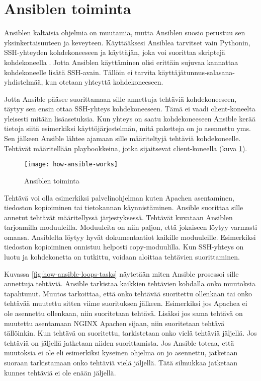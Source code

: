 \section{Ansiblen toiminta}

Ansiblen kaltaisia ohjelmia on muutamia, mutta Ansiblen suosio perustuu sen yksinkertaisuuteen ja keveyteen. Käyttääksesi Ansiblea tarvitset vain Pythonin, SSH-yhteyden kohdekoneeseen ja käyttäjän, joka voi suorittaa skriptejä kohdekoneella \cite{link:what-is-ansible}. Jotta Ansiblen käyttäminen olisi erittäin sujuvaa kannattaa kohdekoneelle lisätä SSH-avain. Tällöin ei tarvita käyttäjätunnus-salasana-yhdistelmää, kun otetaan yhteyttä kohdekoneeseen.

Jotta Ansible pääsee suorittamaan sille annettuja tehtäviä kohdekoneeseen, täytyy sen ensin ottaa SSH-yhteys kohdekoneeseen. Tämä ei vaadi client-koneelta yleisesti mitään lisäasetuksia. Kun yhteys on saatu kohdekoneeseen Ansible kerää tietoja siitä esimerkiksi käyttöjärjestelmän, mitä paketteja on jo asennettu yms. Sen jälkeen Ansible lähtee ajamaan sille määriteltyjä tehtäviä kohdekoneelle. Tehtävät määritellään playbookkeina, jotka sijaitsevat client-koneella (kuva \ref{fig:how-ansible-works}).

\begin{figure}[h]
  \texttt{[image: how-ansible-works]}
  \caption{Ansiblen toiminta}
  \label{fig:how-ansible-works}
\end{figure}

Tehtävä voi olla esimerkiksi palvelinohjelman kuten Apachen asentaminen, tiedoston kopioiminen tai tietokannan käynnistäminen. Ansible suorittaa sille annetut tehtävät määritellyssä järjestyksessä. Tehtävät kuvataan Ansiblen tarjoamilla moduuleilla. Moduuleita on niin paljon, että jokaiseen löytyy varmasti omansa. Ansiblelta löytyy hyvät dokumentaatiot kaikille moduuleille. Esimerkiksi tiedoston kopioiminen onnistuu helposti copy-moduulilla. Kun SSH-yhteys on luotu ja kohdekonetta on tutkittu, voidaan aloittaa tehtävien suorittaminen.

Kuvassa \ref{fig:how-ansible-loops-tasks} näytetään miten Ansible prosessoi sille annettuja tehtäviä. Ansible tarkistaa kaikkien tehtävien kohdalla onko muutoksia tapahtunut. Muutos tarkoittaa, että onko tehtävää suoritettu ollenkaan tai onko tehtävää muutettu sitten viime suorituksen jälkeen. Esimerkiksi jos Apachea ei ole asennettu ollenkaan, niin suoritetaan tehtävä. Lisäksi jos sama tehtävä on muutettu asentamaan NGINX Apachen sijaan, niin suoritetaan tehtävä tällöinkin. Kun tehtävä on suoritettu, tarkistetaan onko vielä tehtäviä jäljellä. Jos tehtäviä on jäljellä jatketaan niiden suorittamista. Jos Ansible toteaa, että muutoksia ei ole eli esimerkiksi kyseinen ohjelma on jo asennettu, jatketaan suoraan tarkistamaan onko tehtäviä vielä jäljellä. Tätä silmukkaa jatketaan kunnes tehtäviä ei ole enään jäljellä.

